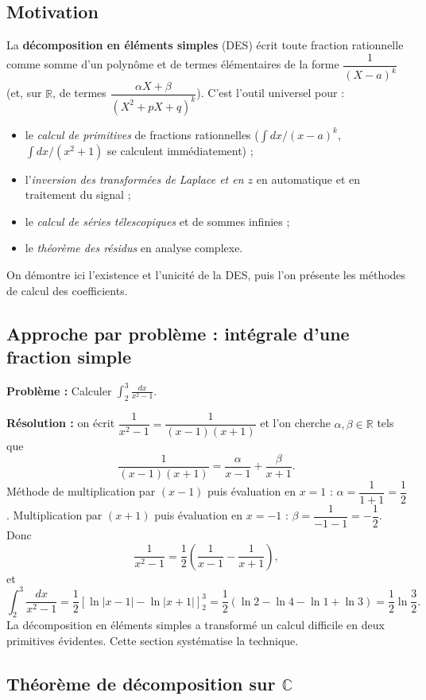 \subsection{Motivation}
La \textbf{décomposition en éléments simples} (DES) écrit toute fraction rationnelle comme somme d'un polynôme et de termes élémentaires de la forme $\dfrac{1}{(X - a)^k}$ (et, sur $\mathbb{R}$, de termes $\dfrac{\alpha X + \beta}{(X^2 + pX + q)^k}$). C'est l'outil universel pour :
\begin{itemize}
    \item le \emph{calcul de primitives} de fractions rationnelles ($\int dx / (x - a)^k$, $\int dx / (x^2 + 1)$ se calculent immédiatement) ;
    \item l'\emph{inversion des transformées de Laplace et en $z$} en automatique et en traitement du signal ;
    \item le \emph{calcul de séries télescopiques} et de sommes infinies ;
    \item le \emph{théorème des résidus} en analyse complexe.
\end{itemize}
On démontre ici l'existence et l'unicité de la DES, puis l'on présente les méthodes de calcul des coefficients.

\subsection{Approche par problème : intégrale d'une fraction simple}
\textbf{Problème :} Calculer $\displaystyle \int_2^3 \frac{dx}{x^2 - 1}$.

\textbf{Résolution :} on écrit $\dfrac{1}{x^2 - 1} = \dfrac{1}{(x - 1)(x + 1)}$ et l'on cherche $\alpha, \beta \in \mathbb{R}$ tels que
\[ \frac{1}{(x - 1)(x + 1)} = \frac{\alpha}{x - 1} + \frac{\beta}{x + 1}. \]
Méthode de multiplication par $(x - 1)$ puis évaluation en $x = 1$ : $\alpha = \dfrac{1}{1 + 1} = \dfrac{1}{2}$.
Multiplication par $(x + 1)$ puis évaluation en $x = -1$ : $\beta = \dfrac{1}{-1 - 1} = -\dfrac{1}{2}$.
Donc
\[ \frac{1}{x^2 - 1} = \frac{1}{2} \left( \frac{1}{x - 1} - \frac{1}{x + 1} \right), \]
et
\[ \int_2^3 \frac{dx}{x^2 - 1} = \frac{1}{2} \left[ \ln|x - 1| - \ln|x + 1| \right]_2^3 = \frac{1}{2} \left( \ln 2 - \ln 4 - \ln 1 + \ln 3 \right) = \frac{1}{2} \ln \frac{3}{2}. \]
La décomposition en éléments simples a transformé un calcul difficile en deux primitives évidentes. Cette section systématise la technique.

\subsection{Théorème de décomposition sur $\mathbb{C}$}

